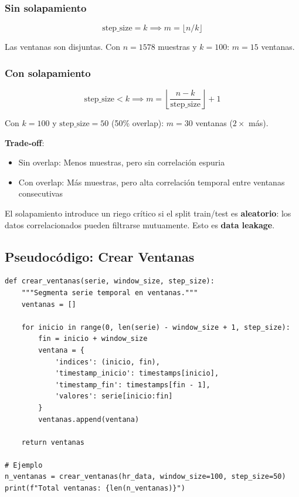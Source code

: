 \documentclass[11pt,twoside,a4paper]{article}
\begin{document}
\subsubsection{Sin solapamiento}
\begin{equation}
\text{step\_size} = k \implies m = \lfloor n / k \rfloor
\end{equation}

Las ventanas son disjuntas. Con $n=1578$ muestras y $k=100$: $m = 15$ ventanas.

\subsubsection{Con solapamiento}
\begin{equation}
\text{step\_size} < k \implies m = \left\lfloor \frac{n - k}{\text{step\_size}} \right\rfloor + 1
\end{equation}

Con $k=100$ y $\text{step\_size}=50$ (50\% overlap): $m = 30$ ventanas ($2\times$ más).

\textbf{Trade-off}:
\begin{itemize}
    \item Sin overlap: Menos muestras, pero sin correlación espuria
    \item Con overlap: Más muestras, pero alta correlación temporal entre ventanas consecutivas
\end{itemize}

El solapamiento introduce un riego crítico si el split train/test es \textbf{aleatorio}: los datos correlacionados pueden filtrarse mutuamente. Esto es \textbf{data leakage}.

\subsection{Pseudocódigo: Crear Ventanas}

\begin{lstlisting}[caption=Algoritmo de windowing]
def crear_ventanas(serie, window_size, step_size):
    """Segmenta serie temporal en ventanas."""
    ventanas = []

    for inicio in range(0, len(serie) - window_size + 1, step_size):
        fin = inicio + window_size
        ventana = {
            'indices': (inicio, fin),
            'timestamp_inicio': timestamps[inicio],
            'timestamp_fin': timestamps[fin - 1],
            'valores': serie[inicio:fin]
        }
        ventanas.append(ventana)

    return ventanas

# Ejemplo
n_ventanas = crear_ventanas(hr_data, window_size=100, step_size=50)
print(f"Total ventanas: {len(n_ventanas)}")
\end{lstlisting}
\end{document}
